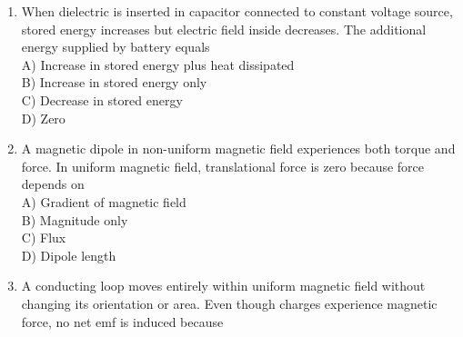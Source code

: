\documentclass[12pt]{article}
\begin{document}
\begin{enumerate}
\begin{center}
\end{center}

A) $6.4\times10^{-34}\,\text{J·s}$\\

B) $3.8\times10^{-34}\,\text{J·s}$\\

C) $6.6\times10^{-34}\,\text{J·s}$\\

D) $1.6\times10^{-19}\,\text{J·s}$

\item When dielectric is inserted in capacitor connected to constant voltage source, stored energy increases but electric field inside decreases. The additional energy supplied by battery equals\\

A) Increase in stored energy plus heat dissipated\\

B) Increase in stored energy only\\

C) Decrease in stored energy\\

D) Zero

\item A magnetic dipole in non-uniform magnetic field experiences both torque and force. In uniform magnetic field, translational force is zero because force depends on\\

A) Gradient of magnetic field\\

B) Magnitude only\\

C) Flux\\

D) Dipole length

\item A conducting loop moves entirely within uniform magnetic field without changing its orientation or area. Even though charges experience magnetic force, no net emf is induced because\\


\end{enumerate}
\end{document}

